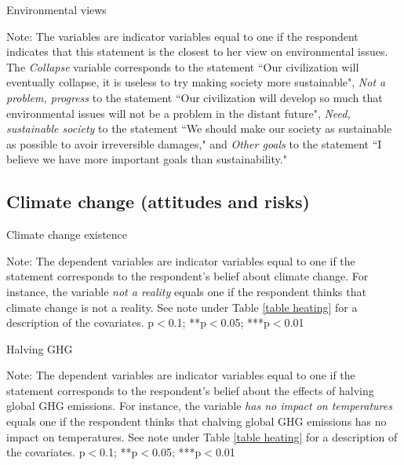 \documentclass{article}
\begin{document}
\begin{table}[h!]
	\caption{Environmental views}
	\begin{center}
		\scalebox{0.7}{}
	\end{center}
	{\footnotesize Note: The variables are indicator variables equal to one if the respondent indicates that this statement is the closest to her view on environmental issues. The \textit{Collapse} variable corresponds to the statement ``Our civilization will eventually collapse, it is useless to try making society more sustainable", \textit{Not a problem, progress} to the statement ``Our civilization will develop so much that environmental issues will not be a problem in the distant future", \textit{Need, sustainable society} to the statement ``We should make our society as sustainable as possible to avoir irreversible damages," and \textit{Other goals} to the statement ``I believe we have more important goals than sustainability."}
\end{table}	

\clearpage
\subsection{Climate change (attitudes and risks)}


\begin{table}[h!]
	\caption{Climate change existence}
	\begin{center}
		\scalebox{0.7}{}
	\end{center}
	{\footnotesize Note: The dependent variables are indicator variables equal to one if the statement corresponds to the respondent's belief about climate change. For instance, the variable \textit{not a reality} equals one if the respondent thinks that climate change is not a reality. See note under Table \ref{table heating} for a description of the covariates.
	\newline *p$<$0.1; **p$<$0.05; ***p$<$0.01}
\end{table}		

\begin{table}[h!]
	\caption{Halving GHG}
	\begin{center}
		\scalebox{0.7}{}
	\end{center}
	{\footnotesize Note: The dependent variables are indicator variables equal to one if the statement corresponds to the respondent's belief about the effects of halving global GHG emissions. For instance, the variable \textit{has no impact on temperatures} equals one if the respondent thinks that chalving global GHG emissions has no impact on temperatures. See note under Table \ref{table heating} for a description of the covariates.
	\newline *p$<$0.1; **p$<$0.05; ***p$<$0.01}
\end{table}
\end{document}
